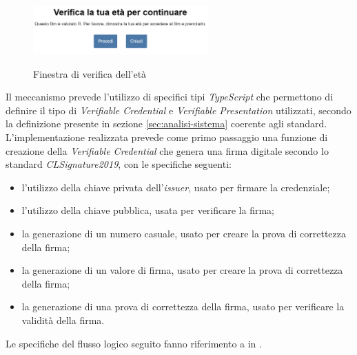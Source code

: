 \begin{figure}[h]
    \centering
    \includegraphics[width=0.6\textwidth, alt={Finestra visualizzata di verifica dell'età}]{immagini/frontend/age-verification.png}
    \caption{Finestra di verifica dell'età}\label{fig:verifica-eta}
\end{figure}

Il meccanismo prevede l'utilizzo di specifici tipi \textit{TypeScript} che permettono di definire il tipo di \textit{Verifiable Credential} e \textit{Verifiable Presentation}
utilizzati, secondo la definizione presente in sezione \ref{sec:analisi-sistema} coerente agli standard.
L'implementazione realizzata prevede come primo passaggio una funzione di creazione della \textit{Verifiable Credential} che genera una firma digitale secondo lo standard \textit{CLSignature2019}, con le specifiche seguenti:
\begin{itemize}
    \item l'utilizzo della chiave privata dell'\textit{issuer}, usato per firmare la credenziale;
    \item l'utilizzo della chiave pubblica, usata per verificare la firma;
    \item la generazione di un numero casuale, usato per creare la prova di correttezza della firma;
    \item la generazione di un valore di firma, usato per creare la prova di correttezza della firma;
    \item la generazione di una prova di correttezza della firma, usato per verificare la validità della firma.
\end{itemize}
Le specifiche del flusso logico seguito fanno riferimento a in \cite{site:clsignature2}.

